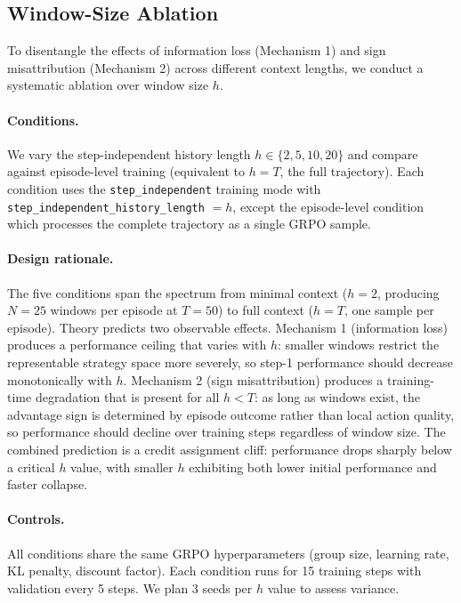 \subsection{Window-Size Ablation}
\label{sec:window_ablation}

To disentangle the effects of information loss (Mechanism 1) and sign misattribution (Mechanism 2) across different context lengths, we conduct a systematic ablation over window size $h$.

\paragraph{Conditions.}
We vary the step-independent history length $h \in \{2, 5, 10, 20\}$ and compare against episode-level training (equivalent to $h = T$, the full trajectory). Each condition uses the \texttt{step\_independent} training mode with \texttt{step\_independent\_history\_length} $= h$, except the episode-level condition which processes the complete trajectory as a single GRPO sample.

\paragraph{Design rationale.}
The five conditions span the spectrum from minimal context ($h = 2$, producing $N = 25$ windows per episode at $T = 50$) to full context ($h = T$, one sample per episode). Theory predicts two observable effects. Mechanism 1 (information loss) produces a performance ceiling that varies with $h$: smaller windows restrict the representable strategy space more severely, so step-1 performance should decrease monotonically with $h$. Mechanism 2 (sign misattribution) produces a training-time degradation that is present for all $h < T$: as long as windows exist, the advantage sign is determined by episode outcome rather than local action quality, so performance should decline over training steps regardless of window size. The combined prediction is a credit assignment cliff: performance drops sharply below a critical $h$ value, with smaller $h$ exhibiting both lower initial performance and faster collapse.

\paragraph{Controls.}
All conditions share the same GRPO hyperparameters (group size, learning rate, KL penalty, discount factor). Each condition runs for 15 training steps with validation every 5 steps. We plan 3 seeds per $h$ value to assess variance. 

